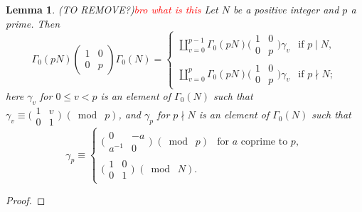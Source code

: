 \documentclass[10pt,leqno,twoside]{article}
\theoremstyle{plain}
\newtheorem{lemma}[lem]{Lemma}
\theoremstyle{definition}
\numberwithin{equation}{section}
\numberwithin{lem}{section}
\newcommand{\textib}[1]{\textbf{\textit{#1\index{#1}}}} %
\newcommand{\smod}[1]{\;(\bmod\; #1)}
\newcommand{\tbd}{{\Huge\color{red}{\textib{TO DO}}}}
\newcommand{\sai}[1]{\textcolor{red}{#1}}
\begin{document}
\begin{lemma}\label{lem: miyake lem 4.5.11} (TO REMOVE?)\sai{bro what is this}
    Let $N$ be a positive integer and $p$ a prime. Then 
    \[\varGamma_0(pN)\begin{pmatrix}
        1 & 0 \\ 0 & p
    \end{pmatrix}\varGamma_0(N) = \begin{cases}
        \coprod_{v = 0}^{p-1}\varGamma_0(pN)\big(\!\begin{smallmatrix}
            1 & 0 \\ 0 & p
        \end{smallmatrix}\!\big)\gamma_v& \text{if $p\mid N$},\\
        \coprod_{v = 0}^p\varGamma_0(pN)\big(\!\begin{smallmatrix}
            1 & 0 \\ 0 & p
        \end{smallmatrix}\!\big)\gamma_v& \text{if $p\nmid N$};
    \end{cases}\]
    here  $\gamma_v$ for $0\leq v<p$ is an element of $\varGamma_0(N)$ such that $\gamma_v \equiv \big(\!\begin{smallmatrix}
        1 & v \\ 0 & 1
    \end{smallmatrix}\!\big)\smod{p}$, and $\gamma_p$ for $p\nmid N$ is an element of $\varGamma_0(N)$ such that 
    \[\gamma_p \equiv\begin{cases}
        \big(\!\begin{smallmatrix}
            0 & -a \\ a^{-1} & 0
        \end{smallmatrix}\!\big)\smod{p}&\text{for $a$ coprime to $p$},\\
        \big(\!\begin{smallmatrix}
            1 & 0 \\ 0 & 1
        \end{smallmatrix}\!\big)\smod{N}.
    \end{cases}\]
\end{lemma}
\begin{proof}
    \tbd
\end{proof}
\end{document}
